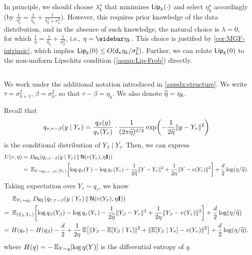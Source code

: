 In principle, we should choose $\lambda_k^\star$ that minimizes $\mathsf{Lip}_k(\cdot)$ and select $\eta_k^\star$ accordingly (by $\frac{1}{\eta_k^\star}=\frac{1}{\eta_k}+\frac{1}{\lambda^\star_k+\sigma_k^2}$). However, this requires prior knowledge of the data distribution, and in the absence of such knowledge, the natural choice is $\lambda=0$, for which $\frac{1}{\eta}=\frac{1}{\eta_k}+\frac{1}{\sigma_k^2}$, i.e., $\eta=\etabar_k$. This choice is justified by \cref{cor:MGF-intrinsic}, which implies $\mathsf{Lip}_k(0)\leq O(\mathsf{d}_\star\eta_k/\sigma_k^2)$. Further, we can relate $\mathsf{Lip}_k(0)$ to the non-uniform Lipschitz condition (\cref{asmp:Lip-Frob}) directly.












\subsection{}
We work under the additional notation introduced in \cref{appdx:structure}. We write $\tau=\sigma_{k+1}^2$, $\beta=\sigma_k^2$, so that $\tau-\beta=\eta_k$. We also denote $\widetilde{\eta}=\eta_k$.

Recall that
\begin{align*}
    q_{\tau,\tau-\beta}(y\mid Y_\tau)=\frac{q_{\beta}(y)}{q_\tau(Y_\tau)}\cdot \frac{1}{(2\pi\wt{\eta})^{d/2}}\exp\prn*{ -\frac{1}{2\wt{\eta}}\nrm{y-Y_\tau}^2 }
\end{align*}
is the conditional distribution of $Y_{\beta}\mid Y_\tau$. 
Then, we can express
\begin{align*}
    U(v,\eta)=&~ \Dkl{q_{\tau,\tau-\beta}(y\mid Y_\tau)}{\normal{v(Y_\tau),\eta\Id}} \\
    =&~\En_{Y\sim q_{\tau,\tau-\beta}(\cdot\mid Y_\tau)}\brk*{ \log q_{\beta}(Y)-\log q_\tau(Y_\tau)-\frac{1}{2\wt{\eta}}\nrm{Y-Y_\tau}^2+\frac{1}{2\eta}\nrm{Y-v(Y_\tau)}^2 }+\frac{d}{2}\log(\eta/\wt{\eta}).
\end{align*}
Taking expectation over $Y_\tau\sim q_\tau$, we know
\begin{align*}
    &~\En_{Y_\tau\sim q_\tau}\Dkl{q_{\tau,\tau-\beta}(y\mid Y_\tau)}{\normal{v(Y_\tau),\eta\Id}} \\
    =&~\En_{(Y_{\beta},Y_\tau)}\brk*{ \log q_{\beta}(Y_{\beta})-\log q_\tau(Y_\tau)-\frac{1}{2\wt{\eta}}\nrm{Y_{\beta}-Y_\tau}^2+\frac{1}{2\eta}\nrm{Y_{\beta}-v(Y_\tau)}^2 }+\frac{d}{2}\log(\eta/\wt{\eta}) \\
    =&~ H(q_\tau)-H(q_{\beta})-\frac{d}{2}+\frac{1}{2\eta}\En\brk*{ \nrm{Y_{\beta}-\En[Y_{\beta}\mid Y_\tau]}^2+\nrm{\En[Y_{\beta}\mid Y_\tau]-v(Y_\tau)}^2 }+\frac{d}{2}\log(\eta/\wt{\eta}),
\end{align*}
where $H(q)=-\operatorname{\mathbb{E}}_{Y\sim q}[\log q(Y)]$ is the differential entropy of $q$. 

